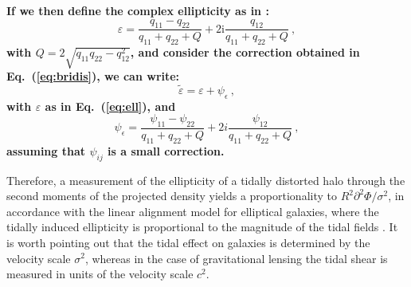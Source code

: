 \documentclass[a4paper,fleqn,usenatbib]{mnras}
\newenvironment{correction}
 {\bfseries}%
  {}%
\begin{document}
\begin{correction}
If we then define the complex ellipticity as in \citet{BartelmannSchneider2001}:
\begin{equation}
\label{eq:ell}
\varepsilon = \frac{q_{11} - q_{22}}{q_{11} + q_{22}+Q} + 2\mathrm{i}\frac{q_{12}}{q_{11} + q_{22}+Q} \ ,
\end{equation} 
with $Q=2\sqrt{q_{11}q_{22}-q_{12}^2}$, and consider the correction obtained in Eq.~(\ref{eq:bridis}), we can write:
\begin{equation}
\label{eq:epsilon}
\widetilde{\varepsilon} = \varepsilon +  \psi_{\epsilon}\ ,
\end{equation} 
with $\varepsilon$ as in Eq.~(\ref{eq:ell}), and
\begin{equation}
\psi_{\epsilon} = \frac{\psi_{11} - \psi_{22}}{q_{11} + q_{22}+Q} + 2i\frac{\psi_{12}}{q_{11} + q_{22}+Q} \ ,
\end{equation}
assuming that $\psi_{ij}$ is a small correction.
\end{correction}


Therefore, a measurement of the ellipticity of a tidally distorted halo through the second moments of the projected density yields a proportionality to $R^2\partial^2\Phi/\sigma^2$, in accordance with the linear alignment model for elliptical galaxies, where the tidally induced ellipticity is proportional to the magnitude of the tidal fields \citep{HirataSeljak2004, Blazeketal2011, Blazeketal2015}. It is worth pointing out that the tidal effect on galaxies is determined by the velocity scale $\sigma^2$, whereas in the case of gravitational lensing the tidal shear is measured in units of the velocity scale $c^2$.
\end{document}
